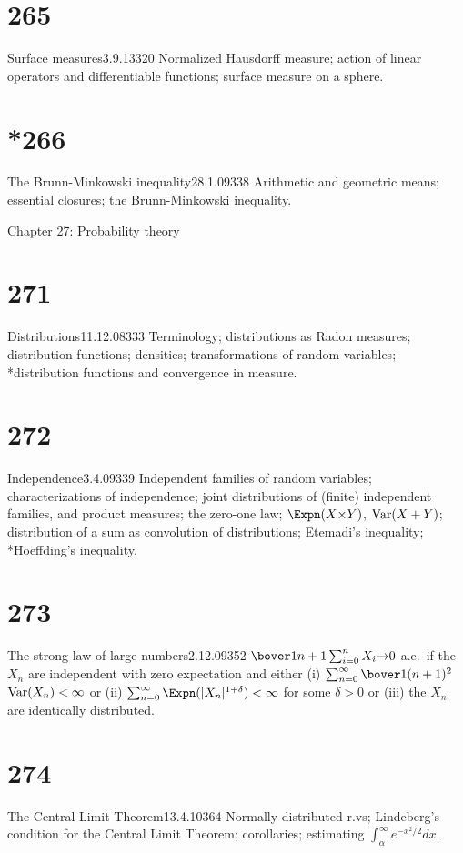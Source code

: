 \section{265}{Surface measures}{3.9.13}{320}{}
{Normalized Hausdorff measure;  action of linear operators and
differentiable functions;  surface measure on a sphere.}

\section{*266}{The Brunn-Minkowski inequality}{28.1.09}{338}{}
{Arithmetic and geometric means;  essential closures;  the
Brunn-Minkowski inequality.}


 Chapter 27:  Probability theory


\section{271}{Distributions}{11.12.08}{333}{}
{Terminology;  distributions as Radon measures;  distribution
functions;  densities;  transformations of random variables;  *distribution
functions and convergence in measure.}

\section{272}{Independence}{3.4.09}{339}{}
{Independent families of random variables;  characterizations of
independence;  joint distributions of (finite) independent families, and
product measures;   the zero-one law;  $\Expn(X{\times}Y)$, $\mathop{\text{Var}}(X+Y)$;
distribution of a sum as convolution of distributions;  Etemadi's
inequality;  *Hoeffding's inequality.}

\section{273}{The strong law of large numbers}{2.12.09}{352}{}
{$\bover1{n+1}\sum_{i=0}^nX_i{\to}0$ a.e.\ if the $X_n$ are
independent with zero expectation and either (i)
$\sum_{n=0}^{\infty}\bover1{(n+1)^2}$
\discretionary{}{}{}$\mathop{\text{Var}}(X_n)<\infty$ or (ii)
$\sum_{n=0}^{\infty}\Expn(|X_n|^{1+\delta})<\infty$ for some $\delta>0$
or (iii) the $X_n$ are identically distributed.}

\section{274}{The Central Limit Theorem}{13.4.10}{364}{}
{Normally distributed r.vs;  Lindeberg's
condition for the Central Limit Theorem;
corollaries;  estimating $\int_{\alpha}^{\infty}e^{-x^2/2}dx$.}

